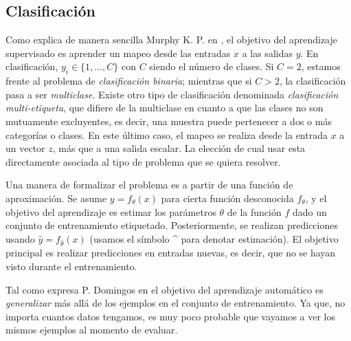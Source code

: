 \subsection{Clasificación}

		Como explica de manera sencilla Murphy K. P. en \cite{Murphy12}, el objetivo del aprendizaje supervisado es aprender un mapeo desde las entradas $x$ a las salidas $y$. En clasificación, $y_i \in \{1,\dots,C\}$ con $C$ siendo el número de clases. Si $C=2$, estamos frente al problema de \textit{clasificación binaria}; mientras que si $C>2$, la clasificación pasa a ser \textit{multiclase}. Existe otro tipo de clasificación denominada \textit{clasificación multi-etiqueta}, que difiere de la multiclase en cuanto a que las clases no son mutuamente excluyentes, es decir, una muestra puede pertenecer a dos o más categorías o clases. En este último caso, el mapeo se realiza desde la entrada $x$ a un vector $z$, más que a una salida escalar. La elección de cual usar esta directamente asociada al tipo de problema que se quiera resolver.
		
		Una manera de formalizar el problema es a partir de una función de aproximación. Se asume $y = f_{\theta}(x)$ para cierta función desconocida $f_{\theta}$, y el objetivo del aprendizaje es estimar los parámetros $\theta$ de la función $f$ dado un conjunto de entrenamiento etiquetado. Posteriormente, se realizan predicciones usando $\hat{y} = f_{\hat{\theta}}(x)$ (usamos el símbolo \string^ para denotar estimación). El objetivo principal es realizar predicciones en entradas nuevas, es decir, que no se hayan visto durante el entrenamiento.
		
		Tal como expresa P. Domingos en \cite{PDomingo} el objetivo del aprendizaje automático es \textit{generalizar} más allá de los ejemplos en el conjunto de entrenamiento. Ya que, no importa cuantos datos tengamos, es muy poco probable que vayamos a ver los mismos ejemplos al momento de evaluar.

	

	
	
	
	
	
	
	
		
		
	
	
	